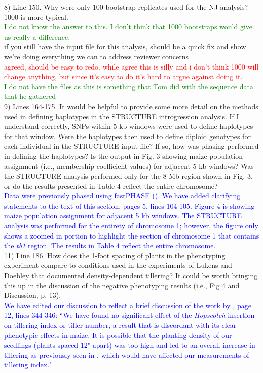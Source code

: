 \documentclass[11pt]{article}
\newcommand{\res}[1]{\noindent \textcolor{blue}{{#1}} \\}
\newcommand{\jri}[1]{\noindent \textcolor{red}{{#1}} \\}
\newcommand{\lev}[1]{\noindent \textcolor{green}{{#1}} \\}
\newcommand{\mbh}[1]{\noindent \textcolor{Dandelion}{{#1}}\\}
\begin{document}
8) Line 150. Why were only 100 bootstrap replicates used for the NJ analysis? 1000 is more typical.\\
\lev{I do not know the answer to this. I don't think that 1000 bootstraps would give us really a difference.}
\mbh{if you still have the input file for this analysis, should be a quick fix and show we're doing everything we can to address reviewer concerns}
\jri{agreed, should be easy to redo. while agree this is silly and i don't think 1000 will change anything, but since it's easy to do it's hard to argue against doing it.}
\lev{I do not have the files as this is something that Tom did with the sequence data that he gathered}

9) Lines 164-175. It would be helpful to provide some more detail on the methods used in defining haplotypes in the STRUCTURE introgression analysis. If I understand correctly, SNPs within 5 kb windows were used to define haplotypes for that window. Were the haplotypes then used to define diploid genotypes for each individual in the STRUCTURE input file? If so, how was phasing performed in defining the haplotypes? Is the output in Fig. 3 showing maize population assignment (i.e., membership coefficient values) for adjacent 5 kb windows? Was the STRUCTURE analysis performed only for the 8 Mb region shown in Fig. 3, or do the results presented in Table 4 reflect the entire chromosome? \\

\res{Data were previously phased using fastPHASE (\citet{Pyhajarvi2013, Scheet2006}). We have added clarifying statements to the text of this section, pages 5, lines 104-105. Figure 4 is showing maize population assignment for adjacent 5 kb windows. The STRUCTURE analysis was performed for the entirety of chromosome 1; however, the figure only shows a zoomed in portion to highlight the section of chromosome 1 that contains the \emph{tb1} region. The results in Table 4 reflect the entire chromosome.}

11) Line 186. How does the 1-foot spacing of plants in the phenotyping experiment compare to conditions used in the experiments of Lukens and Doebley that documented density-dependent tillering? It could be worth bringing this up in the discussion of the negative phenotyping results (i.e., Fig 4 and Discussion, p. 13). \\

\res{We have edited our discussion to reflect a brief discussion of the work by \citet{DoebleyLukens1999}, page 12, lines 344-346: ``We have found no significant effect of the \emph{Hopscotch} insertion on tillering index or tiller number, a result that is discordant with its clear phenotypic effects in maize. It is possible that the planting density of our seedlings (plants spaced 12" apart) was too high and led to an overall increase in tillering as previously seen in \citet{LukensDoebley1999}, which would have affected our measurements of tillering index."}
\end{document}
